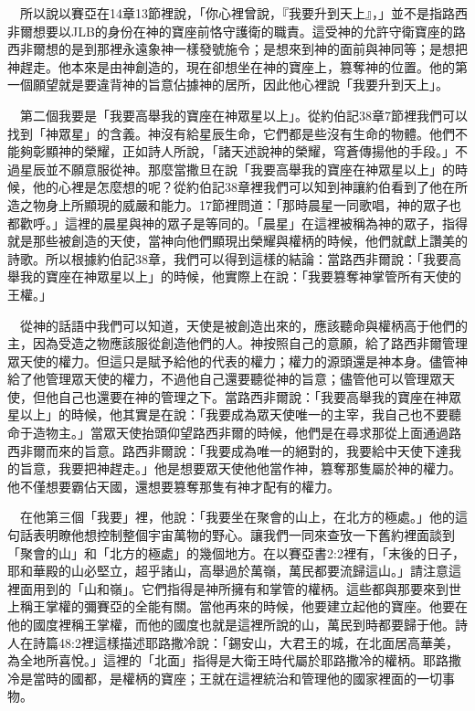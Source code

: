 \documentclass{book}
\begin{document}
　所以說以賽亞在14章13節裡說，「你心裡曾說，『我要升到天上』，」並不是指路西非爾想要以JLB的身份在神的寶座前恪守護衛的職責。這受神的允許守衛寶座的路西非爾想的是到那裡永遠象神一樣發號施令；是想來到神的面前與神同等；是想把神趕走。他本來是由神創造的，現在卻想坐在神的寶座上，篡奪神的位置。他的第一個願望就是要違背神的旨意佔據神的居所，因此他心裡說「我要升到天上」。

　第二個我要是「我要高舉我的寶座在神眾星以上」。從約伯記38章7節裡我們可以找到「神眾星」的含義。神沒有給星辰生命，它們都是些沒有生命的物體。他們不能夠彰顯神的榮耀，正如詩人所說，「諸天述說神的榮耀，穹蒼傳揚他的手段。」不過星辰並不願意服從神。那麼當撒旦在說「我要高舉我的寶座在神眾星以上」的時候，他的心裡是怎麼想的呢？從約伯記38章裡我們可以知到神讓約伯看到了他在所造之物身上所顯現的威嚴和能力。17節裡問道：「那時晨星一同歌唱，神的眾子也都歡呼。」這裡的晨星與神的眾子是等同的。「晨星」在這裡被稱為神的眾子，指得就是那些被創造的天使，當神向他們顯現出榮耀與權柄的時候，他們就獻上讚美的詩歌。所以根據約伯記38章，我們可以得到這樣的結論：當路西非爾說：「我要高舉我的寶座在神眾星以上」的時候，他實際上在說：「我要篡奪神掌管所有天使的王權。」

　從神的話語中我們可以知道，天使是被創造出來的，應該聽命與權柄高于他們的主，因為受造之物應該服從創造他們的人。神按照自己的意願，給了路西非爾管理眾天使的權力。但這只是賦予給他的代表的權力；權力的源頭還是神本身。儘管神給了他管理眾天使的權力，不過他自己還要聽從神的旨意；儘管他可以管理眾天使，但他自己也還要在神的管理之下。當路西非爾說：「我要高舉我的寶座在神眾星以上」的時候，他其實是在說：「我要成為眾天使唯一的主宰，我自己也不要聽命于造物主。」當眾天使抬頭仰望路西非爾的時候，他們是在尋求那從上面通過路西非爾而來的旨意。路西非爾說：「我要成為唯一的絕對的，我要給中天使下達我的旨意，我要把神趕走。」他是想要眾天使他他當作神，篡奪那隻屬於神的權力。他不僅想要霸佔天國，還想要篡奪那隻有神才配有的權力。

　在他第三個「我要」裡，他說：「我要坐在聚會的山上，在北方的極處。」他的這句話表明瞭他想控制整個宇宙萬物的野心。讓我們一同來查攷一下舊約裡面談到「聚會的山」和「北方的極處」的幾個地方。在以賽亞書2:2裡有，「末後的日子，耶和華殿的山必堅立，超乎諸山，高舉過於萬嶺，萬民都要流歸這山。」請注意這裡面用到的「山和嶺」。它們指得是神所擁有和掌管的權柄。這些都與那要來到世上稱王掌權的彌賽亞的全能有關。當他再來的時候，他要建立起他的寶座。他要在他的國度裡稱王掌權，而他的國度也就是這裡所說的山，萬民到時都要歸于他。詩人在詩篇48:2裡這樣描述耶路撒冷說：「錫安山，大君王的城，在北面居高華美，為全地所喜悅。」這裡的「北面」指得是大衛王時代屬於耶路撒冷的權柄。耶路撒冷是當時的國都，是權柄的寶座；王就在這裡統治和管理他的國家裡面的一切事物。
\end{document}
